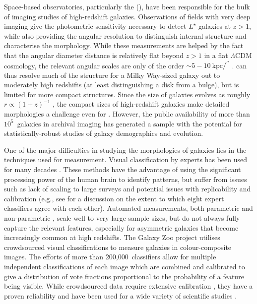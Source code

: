\documentclass[a4paper,fleqn,usenatbib]{mnras}
\begin{document}
Space-based observatories, particularly the \hubble{} (\hst), have been
responsible for the bulk of imaging studies of high-redshift galaxies.
Observations of fields with very deep imaging
\citep[eg,][]{wil96,gia04,bec06,dav07,sco07,gro11,koe11} give the photometric
sensitivity necessary to detect $L^\star$ galaxies at $z>1$, while also
providing the angular resolution to distinguish internal structure and
characterise the morphology. While these measurements are helped by the fact
that the angular diameter distance is relatively flat beyond $z>1$ in a flat
$\Lambda$CDM cosmology, the relevant angular scales are only of the order
$\sim5-10~\mathrm{kpc}/^{\prime\prime}$ \citep{wri06}. \hst{} can thus resolve
much of the structure for a Milky Way-sized galaxy out to moderately high
redshifts (at least distinguishing a disk from a bulge), but is limited for
more compact structures. Since the size of galaxies evolves as roughly
$r\propto(1+z)^{-1}$ \citep{mao98,law12a}, the compact sizes of high-redshift
galaxies make detailed morphologies a challenge even for \hst{} \citep{che12}.
However, the public availability of more than $10^5$~galaxies in archival
imaging has generated a sample with the potential
for statistically-robust studies of galaxy demographics and evolution. 

One of the major difficulties in studying the morphologies of galaxies lies in
the techniques used for measurement. Visual classification by experts has been
used for many decades \citep[eg,][]{hub26,dev59,san61,van76,nai10,bai11,kar15}.
These methods have the advantage of using the significant processing power of
the human brain to identify patterns, but suffer from issues such as lack of
scaling to large surveys and potential issues with replicability and
calibration (e.g., see \citealt{lah95} for a discussion on the extent to which
eight expert classifiers agree with each other). Automated measurements, both
parametric \citep{pen02a,sim11,lac12} and non-parametric
\citep{abr03,con03,lot04,sca07,bam08,fre13}, scale well to very large sample
sizes, but do not always fully capture the relevant features, especially for
asymmetric galaxies that become increasingly common at high redshifts. The
Galaxy Zoo project \citep{lin08,for12} utilises crowdsourced visual classifications
to measure galaxies in colour-composite images. The efforts of more than
200,000~classifiers allow for multiple independent classifications of
each image which are combined and calibrated to give a distribution of vote
fractions proportional to the probability of a feature being visible. While
crowdsourced data require extensive calibration \citep{bam09,wil13}, they have
a proven reliability and have been used for a wide variety of scientific
studies \citep[eg,][]{lan08,bam09,dar10,mas11c,ski12,sim13,sch14,wil15,sme16}. 
\end{document}
